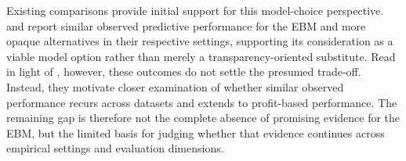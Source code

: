 Existing comparisons provide initial support for this model-choice perspective.
\citet{schwartzEnhancingMLModels2025} and
\citet{amekoeExploringAccuracyInterpretability2024b} report similar observed
predictive performance for the EBM and more opaque alternatives in their respective
settings, supporting its consideration as a viable model option rather than merely
a transparency-oriented substitute. Read in light of
\citet{bahloolPerformanceFairnessExplainability2026}, however, these outcomes do
not settle the presumed trade-off. Instead, they motivate closer examination of
whether similar observed performance recurs across datasets and extends to
profit-based performance. The remaining gap is therefore not the complete absence of
promising evidence for the EBM, but the limited basis for judging whether that
evidence continues across empirical settings and evaluation dimensions.

